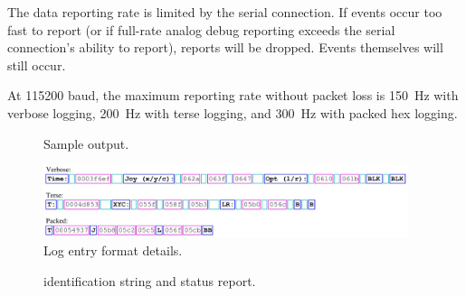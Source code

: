 The data reporting rate is limited by the serial connection. If events 
occur too fast to report (or if full-rate analog debug reporting exceeds the
serial connection's ability to report), reports will be dropped. Events 
themselves will still occur.

At 115200 baud, the maximum reporting rate without packet loss is 150~Hz
with verbose logging, 200~Hz with terse logging, and 300~Hz with packed
hex logging.

\begin{figure}[p]

\caption{Sample {\projectname} output.}\label{fig-output}
\end{figure}

\begin{figure}[p]
\includegraphics[width=0.95\textwidth]{figs/formats.pdf}
\caption{Log entry format details.}
\label{fig-formats}
\end{figure}

\begin{figure}[p]

\caption{{\projectname} identification string and status report.}
\label{fig-status}
\end{figure}

%
